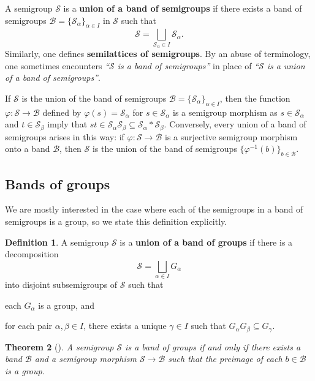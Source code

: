 \documentclass[11pt, oneside, reqno]{amsart}
\newtheorem{theorem}{Theorem}[section]
\theoremstyle{definition}
\newtheorem{definition}[theorem]{Definition}
\numberwithin{equation}{section}
\newcommand{\defn}[1]{{\color{RoyalBlue}\bf#1}}
\def \BB{{\mathcal{B}}}
\def \SS{{\mathcal{S}}}
\begin{document}
A semigroup $\SS$ is a \defn{union of a band of semigroups} if there exists
a band of semigroups $\BB = \{\SS_\alpha\}_{\alpha \in I}$ in $\SS$ such that
\begin{equation*}
    \SS = \bigsqcup_{\SS_\alpha \in I} \SS_\alpha.
\end{equation*}
Similarly, one defines \defn{semilattices of semigroups}.
By an abuse of terminology, one sometimes encounters \emph{``$\SS$ is a band of
semigroups''} in place of \emph{``$\SS$ is a union of a band of semigroups''}.

If $\SS$ is the union of the band of semigroups $\BB
= \{\SS_\alpha\}_{\alpha \in I}$, then the function
$\varphi: \SS \xrightarrow{} \BB$ defined by
$\varphi(s) = \SS_\alpha$ for $s \in \SS_\alpha$ is a semigroup
morphism as $s \in \SS_\alpha$ and $t \in \SS_\beta$ imply that
$s t \in \SS_\alpha \SS_\beta \subseteq \SS_\alpha \ast \SS_\beta$.
Conversely, every union of a band of semigroups arises in this way: if
$\varphi: \SS \xrightarrow{} \BB$ is a surjective semigroup morphism
onto a band $\BB$, then $\SS$ is the union of the band of semigroups
$\{\varphi^{-1}(b)\}_{b \in \BB}$.

\subsection{Bands of groups}
\label{bands-of-groups}

We are mostly interested in the case where each of the semigroups in a band of
semigroups is a group, so we state this definition explicitly.

\begin{definition}
    A semigroup $\SS$ is a \defn{union of a band of groups} if there is a decomposition
    \begin{equation*}
        \SS = \bigsqcup_{\alpha \in I} G_\alpha
    \end{equation*}
    into disjoint subsemigroups of $\SS$ such that
    \begin{enumerate*}[label=(\roman*)]
        \item each $G_\alpha$ is a group, and
        \item for each pair $\alpha, \beta \in I$, there exists
              a unique $\gamma \in I$ such that $G_\alpha G_\beta \subseteq G_\gamma$.
    \end{enumerate*}
\end{definition}

\begin{theorem}[{\cite[Theorem 1]{clifford}}]
    \label{theorem-clifford-band-of-groups}
    A semigroup $\SS$ is a band of groups if and only if there exists a band $\BB$ and a
    semigroup morphism $\SS \to \BB$ such that the preimage of each $b \in \BB$ is a group.
\end{theorem}
\end{document}
